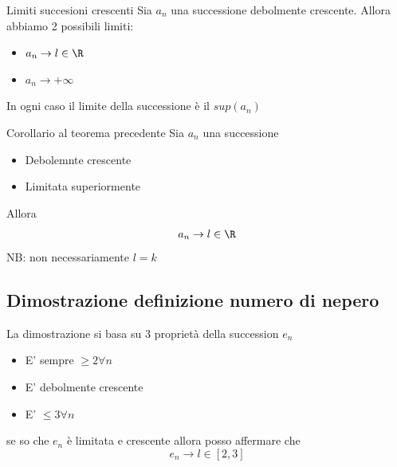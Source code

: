 \begin{teorema}{Limiti succesioni crescenti}
	Sia $a_n$ una successione debolmente crescente. Allora abbiamo 2 possibili limiti:
	\begin{itemize}
		\item $a_n \to l \in  \R$
		\item $ a_n \to + \infty$
	\end{itemize}
	In ogni caso il limite della successione è il $sup\left( a_n \right) $

\end{teorema}

\begin{teorema}{Corollario al teorema precedente}
	Sia $a_n$ una successione
	\begin{itemize}
		\item Debolemnte crescente
		\item Limitata superiormente
	\end{itemize}
	Allora \[
		a_n \to l \in  \R
	\]
	NB: non necessariamente $l = k$
\end{teorema}

\subsection{Dimostrazione definizione numero di nepero}
La dimostrazione si basa su 3 proprietà della succession $ e_n$
\begin{itemize}
	\item E' sempre $\ge 2 \forall n$
	\item E' debolmente crescente
	\item E' $\le 3 \forall n$
\end{itemize}
se so che $e_n$ è limitata e crescente allora posso affermare che
\[
	e_n \to l \in \left[ 2,3 \right]
\]


